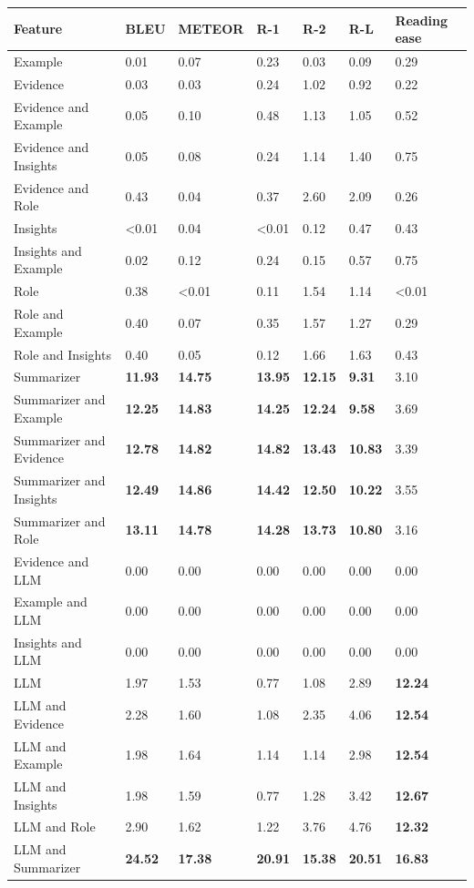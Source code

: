 \begin{tabular}{|l|l|l|l|l|l|l|}
\hline
\textbf{Feature} & BLEU & METEOR & R-1 & R-2 & R-L & Reading ease \\
 \hline
 Example & 0.01 & 0.07 & 0.23 & 0.03 & 0.09 & 0.29 \\
 \hline
 Evidence & 0.03 & 0.03 & 0.24 & 1.02 & 0.92 & 0.22 \\
 \hline
 Evidence and Example & 0.05 & 0.10 & 0.48 & 1.13 & 1.05 & 0.52 \\
 \hline
 Evidence and Insights & 0.05 & 0.08 & 0.24 & 1.14 & 1.40 & 0.75 \\
 \hline
 Evidence and Role & 0.43 & 0.04 & 0.37 & 2.60 & 2.09 & 0.26 \\
 \hline
 Insights & \textless{}0.01 & 0.04 & \textless{}0.01 & 0.12 & 0.47 & 0.43 \\
 \hline
 Insights and Example & 0.02 & 0.12 & 0.24 & 0.15 & 0.57 & 0.75 \\
 \hline
 Role & 0.38 & \textless{}0.01 & 0.11 & 1.54 & 1.14 & \textless{}0.01 \\
 \hline
 Role and Example & 0.40 & 0.07 & 0.35 & 1.57 & 1.27 & 0.29 \\
 \hline
 Role and Insights & 0.40 & 0.05 & 0.12 & 1.66 & 1.63 & 0.43 \\
 \hline
 Summarizer & \textbf{11.93} & \textbf{14.75} & \textbf{13.95} & \textbf{12.15} & \textbf{9.31} & 3.10 \\
 \hline
 Summarizer and Example & \textbf{12.25} & \textbf{14.83} & \textbf{14.25} & \textbf{12.24} & \textbf{9.58} & 3.69 \\
 \hline
 Summarizer and Evidence & \textbf{12.78} & \textbf{14.82} & \textbf{14.82} & \textbf{13.43} & \textbf{10.83} & 3.39 \\
 \hline
 Summarizer and Insights & \textbf{12.49} & \textbf{14.86} & \textbf{14.42} & \textbf{12.50} & \textbf{10.22} & 3.55 \\
 \hline
 Summarizer and Role & \textbf{13.11} & \textbf{14.78} & \textbf{14.28} & \textbf{13.73} & \textbf{10.80} & 3.16 \\
 \hline
 Evidence and LLM & 0.00 & 0.00 & 0.00 & 0.00 & 0.00 & 0.00 \\
 \hline
 Example and LLM & 0.00 & 0.00 & 0.00 & 0.00 & 0.00 & 0.00 \\
 \hline
 Insights and LLM & 0.00 & 0.00 & 0.00 & 0.00 & 0.00 & 0.00 \\
 \hline
 LLM & 1.97 & 1.53 & 0.77 & 1.08 & 2.89 & \textbf{12.24} \\
 \hline
 LLM and Evidence & 2.28 & 1.60 & 1.08 & 2.35 & 4.06 & \textbf{12.54} \\
 \hline
 LLM and Example & 1.98 & 1.64 & 1.14 & 1.14 & 2.98 & \textbf{12.54} \\
 \hline
 LLM and Insights & 1.98 & 1.59 & 0.77 & 1.28 & 3.42 & \textbf{12.67} \\
 \hline
 LLM and Role & 2.90 & 1.62 & 1.22 & 3.76 & 4.76 & \textbf{12.32} \\
 \hline
 LLM and Summarizer & \textbf{24.52} & \textbf{17.38} & \textbf{20.91} & \textbf{15.38} & \textbf{20.51} & \textbf{16.83} \\
\hline
\end{tabular}

